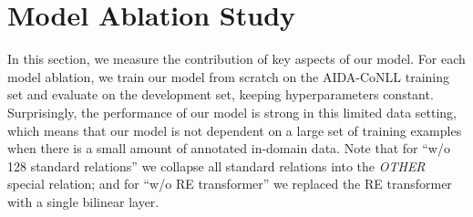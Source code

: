 \documentclass[11pt]{article}
\begin{document}
\section{Model Ablation Study}
\label{sec:ablation-study}
In this section, we measure the contribution of key aspects of our model. For each model ablation, we train our model from scratch on the AIDA-CoNLL training set and evaluate on the development set, keeping hyperparameters constant. Surprisingly, the performance of our model is strong in this limited data setting, which means that our model is not dependent on a large set of training examples when there is a small amount of annotated in-domain data. Note that for ``w/o 128 standard relations'' we collapse all standard relations into the \emph{OTHER} special relation; and for ``w/o RE transformer'' we replaced the RE transformer with a single bilinear layer. 
\begin{table}[h]
\centering
{}
\caption{ED F1 score on AIDA-CoNLL development split for model ablations trained from scratch on AIDA-CoNLL training split using the standard CoNLL candidates \cite{hoffart-etal-2011-robust}. The result is in \textcolor{red}{red} when the performance drops by more than 0.7.}
\label{tab:model-ablations}
\end{table}
\end{document}
